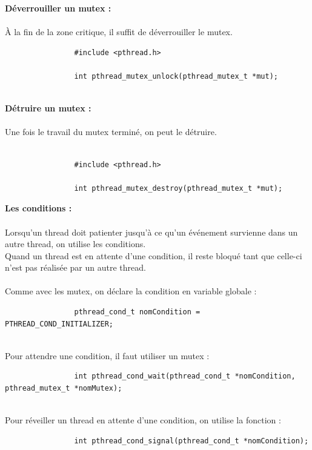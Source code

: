 		\begin{frame}[containsverbatim]
			\textbf{Déverrouiller un mutex :}
			\\~\\
			À la fin de la zone critique, il suffit de déverrouiller le mutex.
			\begin{lstlisting}
				#include <pthread.h>

				int pthread_mutex_unlock(pthread_mutex_t *mut);
			\end{lstlisting}
			~\\
			\textbf{Détruire un mutex :}
			\\~\\
			Une fois le travail du mutex terminé, on peut le détruire.
			\\~\\
			\begin{lstlisting}
				#include <pthread.h>

				int pthread_mutex_destroy(pthread_mutex_t *mut);
			\end{lstlisting}
		\end{frame}
		
		\begin{frame}[containsverbatim]
			\textbf{Les conditions :}
			\\~\\
			Lorsqu'un thread doit patienter jusqu'à ce qu'un événement survienne dans un autre thread, on utilise les conditions.\\
			Quand un thread est en attente d'une condition, il reste bloqué tant que celle-ci n'est pas réalisée par un autre thread.
			\\~\\
			Comme avec les mutex, on déclare la condition en variable globale :
			\begin{lstlisting}
				pthread_cond_t nomCondition = PTHREAD_COND_INITIALIZER;
			\end{lstlisting}
			~\\
			Pour attendre une condition, il faut utiliser un mutex :
			\begin{lstlisting}
				int pthread_cond_wait(pthread_cond_t *nomCondition, pthread_mutex_t *nomMutex);
			\end{lstlisting}
			~\\
			Pour réveiller un thread en attente d'une condition, on utilise la fonction :
			\begin{lstlisting}
				int pthread_cond_signal(pthread_cond_t *nomCondition);
			\end{lstlisting}
		\end{frame}	
		
